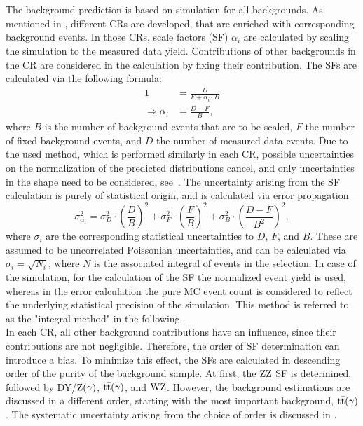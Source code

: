 \\\\The background prediction is based on simulation for all backgrounds. As mentioned in , different CRs are developed, that are enriched with corresponding background events. In those CRs, scale factors (SF) $\alpha_i$ are calculated by scaling the simulation to the measured data yield. Contributions of other backgrounds in the CR are considered in the calculation by fixing their contribution. The SFs are calculated via the following formula:
\begin{align}
 1                        & = \frac{D}{F+\alpha_i\cdot B} \\
 \Longrightarrow \alpha_i & = \frac{D-F}{B},              
\end{align}
where $B$ is the number of background events that are to be scaled, $F$ the number of fixed background events, and $D$ the number of measured data events.
Due to the used method, which is performed similarly in each CR, possible uncertainties on the normalization of the predicted distributions cancel, and only uncertainties in the shape need to be considered, see~. The uncertainty arising from the SF calculation is purely of statistical origin, and is calculated via error propagation
\begin{equation}
 \sigma_{\alpha_i}^2 = \sigma_{D}^2 \cdot \left(\frac{D}{B}\right)^2 + \sigma_{F}^2 \cdot \left(\frac{F}{B}\right)^2 + \sigma_{B}^2 \cdot \left(\frac{D-F}{B^2}\right)^2,
\end{equation}
where $\sigma_i$ are the corresponding statistical uncertainties to $D$, $F$, and $B$. These are assumed to be uncorrelated Poissonian uncertainties, and can be calculated via $\sigma_i=\sqrt{N_i}$, where $N$ is the associated integral of events in the selection. In case of the simulation, for the calculation of the SF the normalized event yield is used, whereas in the error calculation the pure MC event count is considered to reflect the underlying statistical precision of the simulation. This method is referred to as the "integral method" in the following.\\
In each CR, all other background contributions have an influence, since their contributions are not negligible. Therefore, the order of SF determination can introduce a bias. To minimize this effect, the SFs are calculated in descending order of the purity of the background sample. At first, the $\mathrm{Z}\mathrm{Z}$ SF is determined, followed by DY/$\mathrm{Z}(\gamma)$, ${\mathrm{t}\overline{\mathrm{t}}}(\gamma)$, and $\mathrm{W}\mathrm{Z}$. However, the background estimations are discussed in a different order, starting with the most important background, ${\mathrm{t}\overline{\mathrm{t}}}(\gamma)$. The systematic uncertainty arising from the choice of order is discussed in .\\
